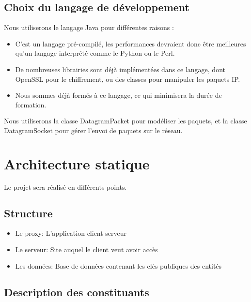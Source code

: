 \documentclass[a4paper,11pt,french]{article}
\begin{document}
\subsection{Choix du langage de développement}
Nous utiliserons le langage Java pour différentes raisons :
\begin{itemize}
\item C'est un langage pré-compilé, les performances devraient donc être meilleures qu'un langage interprété comme le Python ou le Perl.
\item De nombreuses librairies sont déjà implémentées dans ce langage, dont OpenSSL pour le chiffrement, ou des classes pour manipuler les paquets IP.
\item Nous sommes déjà formés à ce langage, ce qui minimisera la durée de formation.
\end{itemize}

Nous utiliserons la classe DatagramPacket pour modéliser les paquets, et la classe DatagramSocket pour gérer l'envoi de paquets sur le réseau.





\section{Architecture statique}
Le projet sera réalisé en différents points. 
\subsection{Structure}
\begin{itemize}
\item Le proxy: L'application client-serveur
\item Le serveur: Site auquel le client veut avoir accès
\item Les données: Base de données contenant les clés publiques des entités
\end{itemize}




\subsection{Description des constituants}
\end{document}
